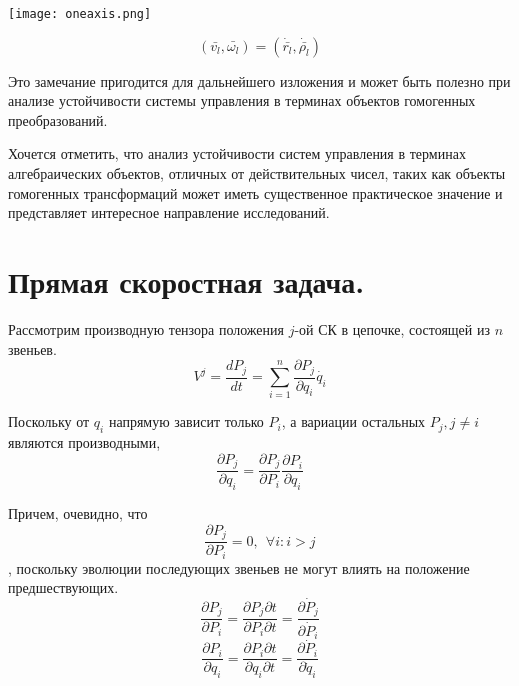 \documentclass[12pt,a4paper,titlepage]{article}
\begin{document}
\begin{center}
  \texttt{[image: oneaxis.png]}
  \label{}
\end{center}

\begin{equation}
(\bar{v_l},\bar{\omega_l}) = (\dot{\bar{r_l}},\dot{\bar{\rho_l}})
\end{equation}

Это замечание пригодится для дальнейшего изложения и может быть полезно при анализе устойчивости системы управления в терминах объектов гомогенных преобразований. 

Хочется отметить, что анализ устойчивости систем управления в терминах алгебраических объектов, отличных от действительных чисел, таких как объекты гомогенных трансформаций может иметь существенное практическое значение и представляет интересное направление исследований.

\newpage
\section{Прямая скоростная задача.}

Рассмотрим производную тензора положения $j$-ой СК в цепочке, состоящей из $n$ звеньев.
\begin{equation}\label{eq1}
V^j = \frac{dP_j}{dt} = \sum_{i=1}^{n}\frac{\partial{P_j}}{\partial{q_i}}\dot{q_i} 
\end{equation}

Поскольку от $q_i$ напрямую зависит только $P_i$, а вариации остальных $P_j, j \neq i$ являются производными,
\begin{equation}\label{}
\frac{\partial{P_j}}{\partial{q_i}} = \frac{\partial{P_j}}{\partial{P_i}}\frac{\partial{P_i}}{\partial{q_i}}
\end{equation}

Причем, очевидно, что 
\begin{equation}\label{}
\frac{\partial{P_j}}{\partial{P_i}} = 0, \ \ \forall i: i > j
\end{equation}
, поскольку эволюции последующих звеньев не могут влиять на положение предшествующих.
\begin{equation}\label{}
\frac{\partial{P_j}}{\partial{P_i}} = \frac{\partial{P_j}\partial{t}}{\partial{P_i}\partial{t}} = \frac{\partial{\dot{P}_j}}{\partial{\dot{P}_i}}
\end{equation}
\begin{equation}\label{}
\frac{\partial{P_i}}{\partial{q_i}} = \frac{\partial{P_i}\partial{t}}{\partial{q_i}\partial{t}} = \frac{\partial{\dot{P}_i}}{\partial{\dot{q}_i}}
\end{equation}
\end{document}
